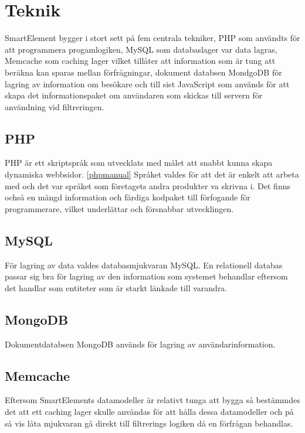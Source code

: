\section{Teknik}

SmartElement bygger i stort sett på fem centrala tekniker, PHP som användts för att programmera progamlogiken, MySQL som databaslager var data lagras, Memcache som caching lager vilket tillåter att information som är tung att beräkna kan sparas mellan förfrågningar, dokument databsen MondgoDB för lagring av information om besökare och till sist JavaScript som används för att skapa det informationspaket om användaren som skickas till servern för användning vid filtreringen.

\subsection{PHP}

PHP är ett skriptspråk som utvecklats med målet att snabbt kunna skapa dynamiska webbsidor. \ref{phpmanual} Språket valdes för att det är enkelt att arbeta med och det var språket som företagets andra produkter va skrivna i. Det finns ochså en mängd information och färdiga kodpaket till förfogande för programmerare, vilket underlättar och försnabbar utvecklingen.

\subsection{MySQL}

För lagring av data valdes databasmjukvaran MySQL. En relationell databas passar sig bra för lagring av den information som systemet behandlar eftersom det handlar som entiteter som är starkt länkade till varandra.

\subsection{MongoDB}

Dokumentdatabsen MongoDB används för lagring av användarinformation.

\subsection{Memcache}

Eftersom SmartElements datamodeller är relativt tunga att bygga så bestämmdes det att ett caching lager skulle användas för att hålla dessa datamodeller och på så vis låta mjukvaran gå direkt till filtrerings logiken då en förfrågan behandlas.

